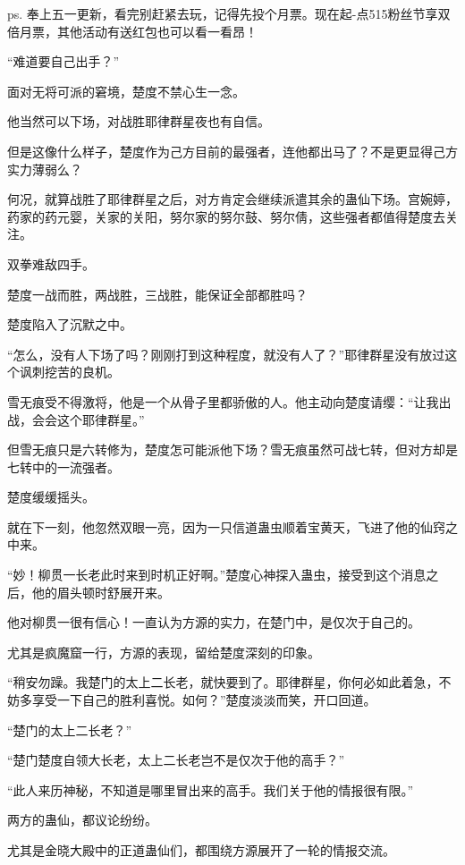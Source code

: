 
\begin{this_body}

ps. 奉上五一更新，看完别赶紧去玩，记得先投个月票。现在起-点515粉丝节享双倍月票，其他活动有送红包也可以看一看昂！

“难道要自己出手？”

面对无将可派的窘境，楚度不禁心生一念。

他当然可以下场，对战胜耶律群星夜也有自信。

但是这像什么样子，楚度作为己方目前的最强者，连他都出马了？不是更显得己方实力薄弱么？

何况，就算战胜了耶律群星之后，对方肯定会继续派遣其余的蛊仙下场。宫婉婷，药家的药元婴，关家的关阳，努尔家的努尔鼓、努尔倩，这些强者都值得楚度去关注。

双拳难敌四手。

楚度一战而胜，两战胜，三战胜，能保证全部都胜吗？

楚度陷入了沉默之中。

“怎么，没有人下场了吗？刚刚打到这种程度，就没有人了？”耶律群星没有放过这个讽刺挖苦的良机。

雪无痕受不得激将，他是一个从骨子里都骄傲的人。他主动向楚度请缨：“让我出战，会会这个耶律群星。”

但雪无痕只是六转修为，楚度怎可能派他下场？雪无痕虽然可战七转，但对方却是七转中的一流强者。

楚度缓缓摇头。

就在下一刻，他忽然双眼一亮，因为一只信道蛊虫顺着宝黄天，飞进了他的仙窍之中来。

“妙！柳贯一长老此时来到时机正好啊。”楚度心神探入蛊虫，接受到这个消息之后，他的眉头顿时舒展开来。

他对柳贯一很有信心！一直认为方源的实力，在楚门中，是仅次于自己的。

尤其是疯魔窟一行，方源的表现，留给楚度深刻的印象。

“稍安勿躁。我楚门的太上二长老，就快要到了。耶律群星，你何必如此着急，不妨多享受一下自己的胜利喜悦。如何？”楚度淡淡而笑，开口回道。

“楚门的太上二长老？”

“楚门楚度自领大长老，太上二长老岂不是仅次于他的高手？”

“此人来历神秘，不知道是哪里冒出来的高手。我们关于他的情报很有限。”

两方的蛊仙，都议论纷纷。

尤其是金晓大殿中的正道蛊仙们，都围绕方源展开了一轮的情报交流。


\end{this_body}
